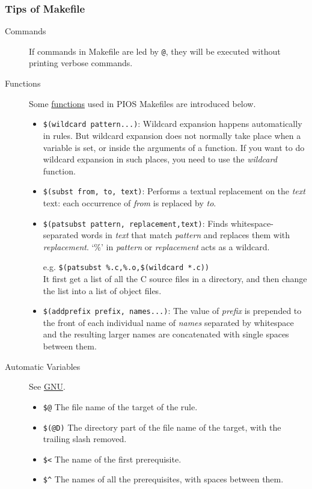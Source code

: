 \subsubsection{Tips of Makefile}
\begin{description}
\item [Commands] If commands in Makefile are led by \verb|@|, they will be executed without printing verbose commands.
\item [Functions] Some \href{http://www.gnu.org/s/hello/manual/make/Text-Functions.html}{functions} used in PIOS Makefiles are introduced below.
\begin{itemize}
\item \verb|$(wildcard pattern...)|: Wildcard expansion happens automatically in rules. But wildcard expansion does not normally take place when a variable is set, or inside the arguments of a function. If you want to do wildcard expansion in such places, you need to use the {\em wildcard} function. 
\item \verb|$(subst from, to, text)|: Performs a textual replacement on the {\em text} text: each occurrence of {\em from} is replaced by {\em to}. 
\item \verb|$(patsubst pattern, replacement,text)|: Finds whitespace-separated words in {\em text} that match {\em pattern} and replaces them with {\em replacement}. `\%' in {\em pattern} or {\em replacement} acts as a wildcard.

e.g. \verb|$(patsubst %.c,%.o,$(wildcard *.c))|
\\\indent It first get a list of all the C source files in a directory, and then change the list into a list of object files.
\item \verb|$(addprefix prefix, names...)|: The value of {\em prefix} is prepended to the front of each individual name of {\em names} separated by whitespace and the resulting larger names are concatenated with single spaces between them. 
\end{itemize}
\item [Automatic Variables] See \href{http://www.gnu.org/software/make/manual/make.html#Automatic-Variables}{GNU}.
\begin{itemize}
  \item \verb|$@| The file name of the target of the rule.
  \item \verb|$(@D)| The directory part of the file name of the target, with the trailing slash removed.
  \item \verb|$<| The name of the first prerequisite.
  \item \verb|$^| The names of all the prerequisites, with spaces between them.
\end{itemize}
\end{description}

